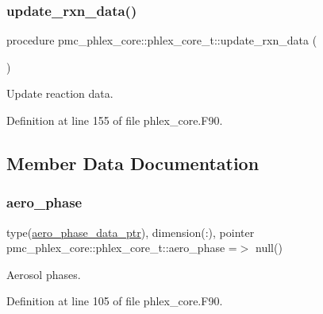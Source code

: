 \subsubsection{\texorpdfstring{update\+\_\+rxn\+\_\+data()}{update\_rxn\_data()}}
{\footnotesize\ttfamily procedure pmc\+\_\+phlex\+\_\+core\+::phlex\+\_\+core\+\_\+t\+::update\+\_\+rxn\+\_\+data (\begin{DoxyParamCaption}{ }\end{DoxyParamCaption})\hspace{0.3cm}{\ttfamily [private]}}



Update reaction data. 



Definition at line 155 of file phlex\+\_\+core.\+F90.



\subsection{Member Data Documentation}
\mbox{\label{structpmc__phlex__core_1_1phlex__core__t_a36e8ce5078423a0d2abdd279b1941b9d}} 
\subsubsection{\texorpdfstring{aero\+\_\+phase}{aero\_phase}}
{\footnotesize\ttfamily type(\mbox{\hyperlink{structpmc__aero__phase__data_1_1aero__phase__data__ptr}{aero\+\_\+phase\+\_\+data\+\_\+ptr}}), dimension(\+:), pointer pmc\+\_\+phlex\+\_\+core\+::phlex\+\_\+core\+\_\+t\+::aero\+\_\+phase =$>$ null()\hspace{0.3cm}{\ttfamily [private]}}



Aerosol phases. 



Definition at line 105 of file phlex\+\_\+core.\+F90.

\mbox{\label{structpmc__phlex__core_1_1phlex__core__t_a1228d9facb6bdb34bf401b7d946a16f0}} 
